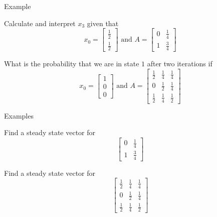 \documentclass{beamer}
\begin{document}
\begin{frame}{Example}
\begin{example}
	Calculate and interpret $x_3$ given that
	\begin{equation*}
	x_0 = \left[
	\begin{matrix}
	\frac{1}{2}\\
	\frac{1}{2}
	\end{matrix}
	\right] \text{ and }
	A = \left[
	\begin{matrix}
	0 & \frac{1}{4}\\
	1 & \frac{3}{4}
	\end{matrix}
	\right]
	\end{equation*}
\end{example}
\begin{example}
	What is the probability that we are in state $1$ after two iterations if
	\begin{equation*}
	x_0 = \left[
	\begin{matrix}
	1\\
	0\\
	0
	\end{matrix}
	\right] \text{ and }
	A = \left[
	\begin{matrix}
	\frac{1}{2} & \frac{1}{4} & \frac{1}{4}\\
	0 & \frac{1}{2} & \frac{1}{4}\\
	\frac{1}{2} & \frac{1}{4} & \frac{1}{2}
	\end{matrix}
	\right]
	\end{equation*}
\end{example}
\end{frame}

\begin{frame}{Examples}
\begin{example}
	Find a steady state vector for 
	\begin{equation*}
	\left[
	\begin{matrix}
	0 & \frac{1}{4}\\
	1 & \frac{3}{4}
	\end{matrix}
	\right]
	\end{equation*}
\end{example}
\begin{example}
	Find a steady state vector for 
	\begin{equation*}
	\left[
	\begin{matrix}
	\frac{1}{2} & \frac{1}{4} & \frac{1}{4}\\
	0 & \frac{1}{2} & \frac{1}{4}\\
	\frac{1}{2} & \frac{1}{4} & \frac{1}{2}
	\end{matrix}
	\right]
	\end{equation*}
\end{example}
\end{frame}
\end{document}
